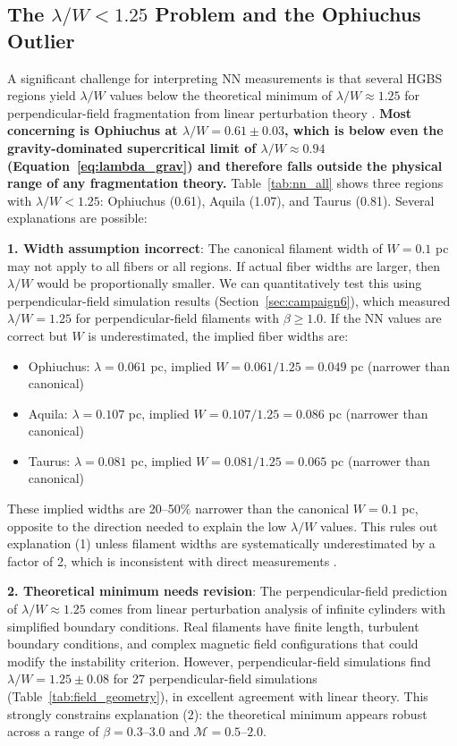 \documentclass[twoside,twocolumn]{mnras}
\begin{document}
\subsection{The $\lambda/W < 1.25$ Problem and the Ophiuchus Outlier}
\label{sec:lambda_min}

A significant challenge for interpreting NN measurements is that several HGBS regions yield $\lambda/W$ values below the theoretical minimum of $\lambda/W \approx 1.25$ for perpendicular-field fragmentation from linear perturbation theory \citep{Nakamura1993}. \textbf{Most concerning is Ophiuchus at $\lambda/W = 0.61 \pm 0.03$, which is below even the gravity-dominated supercritical limit of $\lambda/W \approx 0.94$ (Equation~\ref{eq:lambda_grav}) and therefore falls outside the physical range of any fragmentation theory.} Table~\ref{tab:nn_all} shows three regions with $\lambda/W < 1.25$: Ophiuchus (0.61), Aquila (1.07), and Taurus (0.81). Several explanations are possible:

\textbf{1. Width assumption incorrect}: The canonical filament width of $W = 0.1$ pc \citep{Arzoumanian2011} may not apply to all fibers or all regions. If actual fiber widths are larger, then $\lambda/W$ would be proportionally smaller. We can quantitatively test this using perpendicular-field simulation results (Section~\ref{sec:campaign6}), which measured $\lambda/W = 1.25$ for perpendicular-field filaments with $\beta \geq 1.0$. If the NN values are correct but $W$ is underestimated, the implied fiber widths are:
\begin{itemize}
    \item Ophiuchus: $\lambda = 0.061$ pc, implied $W = 0.061/1.25 = 0.049$ pc (narrower than canonical)
    \item Aquila: $\lambda = 0.107$ pc, implied $W = 0.107/1.25 = 0.086$ pc (narrower than canonical)
    \item Taurus: $\lambda = 0.081$ pc, implied $W = 0.081/1.25 = 0.065$ pc (narrower than canonical)
\end{itemize}
These implied widths are 20--50\% narrower than the canonical $W = 0.1$ pc, opposite to the direction needed to explain the low $\lambda/W$ values. This rules out explanation (1) unless filament widths are systematically underestimated by a factor of 2, which is inconsistent with direct measurements \citep{Arzouman2011, Hacar2013}.

\textbf{2. Theoretical minimum needs revision}: The perpendicular-field prediction of $\lambda/W \approx 1.25$ comes from linear perturbation analysis of infinite cylinders with simplified boundary conditions. Real filaments have finite length, turbulent boundary conditions, and complex magnetic field configurations that could modify the instability criterion. However, perpendicular-field simulations find $\lambda/W = 1.25 \pm 0.08$ for 27 perpendicular-field simulations (Table~\ref{tab:field_geometry}), in excellent agreement with linear theory. This strongly constrains explanation (2): the theoretical minimum appears robust across a range of $\beta = 0.3$--$3.0$ and $\mathcal{M} = 0.5$--$2.0$.
\end{document}
